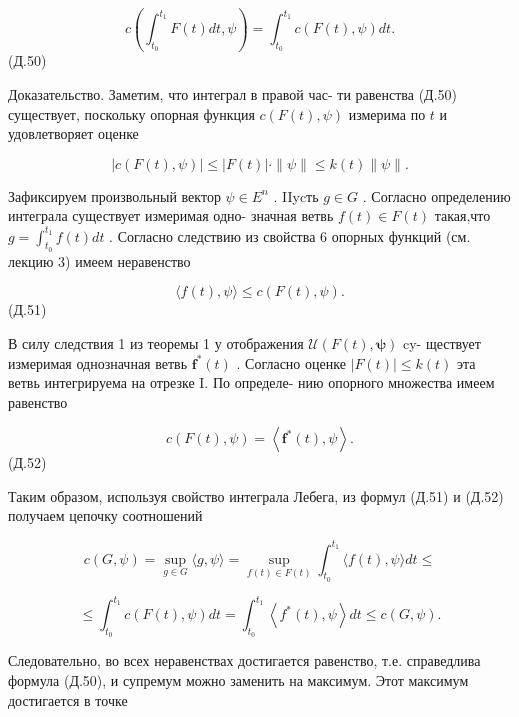 \documentclass[8pt]{extarticle}
\begin{document}
\[
c\left( {{\int }_{{t}_{0}}^{{t}_{1}}F\left( t\right) {dt},\psi }\right)  = {\int }_{{t}_{0}}^{{t}_{1}}c\left( {F\left( t\right) ,\psi }\right) {dt}.
\]
 (Д.50)

Доказательство. Заметим, что интеграл в правой час- ти равенства (Д.50) существует, поскольку опорная функция \(c\left( {F\left( t\right) ,\psi }\right)\) измерима по \(t\) и удовлетворяет оценке

\[
\left| {c\left( {F\left( t\right) ,\psi }\right) }\right|  \leq  \left| {F\left( t\right) }\right|  \cdot  \parallel \psi \parallel  \leq  k\left( t\right) \parallel \psi \parallel .
\]

Зафиксируем произвольный вектор \(\psi  \in  {E}^{n}\) . IIycть \(g \in  G\) . Согласно определению интеграла существует измеримая одно- значная ветвь \(f\left( t\right)  \in  F\left( t\right)\) такая,что \(g = {\int }_{{t}_{0}}^{{t}_{1}}f\left( t\right) {dt}\) . Согласно следствию из свойства 6 опорных функций (см. лекцию 3) имеем неравенство

\[
\langle f\left( t\right) ,\psi \rangle  \leq  c\left( {F\left( t\right) ,\psi }\right) .
\]
 (Д.51)

В силу следствия 1 из теоремы 1 у отображения \(\mathcal{U}\left( {F\left( t\right) ,\mathbf{\psi }}\right)\) cy- ществует измеримая однозначная ветвь \({\mathbf{f}}^{ * }\left( t\right)\) . Согласно оценке \(\left| {F\left( t\right) }\right|  \leq  k\left( t\right)\) эта ветвь интегрируема на отрезке I. По определе- нию опорного множества имеем равенство

\[
c\left( {F\left( t\right) ,\psi }\right)  = \left\langle  {{\mathbf{f}}^{ * }\left( t\right) ,\psi }\right\rangle  .
\]
 (Д.52)

Таким образом, используя свойство интеграла Лебега, из формул (Д.51) и (Д.52) получаем цепочку соотношений

\[
c\left( {G,\psi }\right)  = \mathop{\sup }\limits_{{g \in  G}}\langle g,\psi \rangle  = \mathop{\sup }\limits_{{f\left( t\right)  \in  F\left( t\right) }}{\int }_{{t}_{0}}^{{t}_{1}}\langle f\left( t\right) ,\psi \rangle {dt} \leq
\]

\[
\leq  {\int }_{{t}_{0}}^{{t}_{1}}c\left( {F\left( t\right) ,\psi }\right) {dt} = {\int }_{{t}_{0}}^{{t}_{1}}\left\langle  {{f}^{ * }\left( t\right) ,\psi }\right\rangle  {dt} \leq  c\left( {G,\psi }\right) .
\]

Следовательно, во всех неравенствах достигается равенство, т.е. справедлива формула (Д.50), и супремум можно заменить на максимум. Этот максимум достигается в точке
\end{document}
